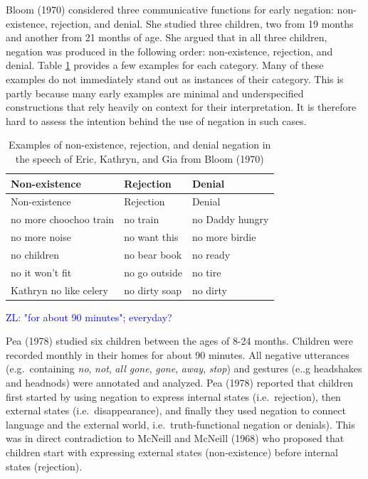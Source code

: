 \documentclass[
  english,
  man,floatsintext]{apa6}
\begin{document}
Bloom (1970) considered three communicative functions for early negation: non-existence, rejection, and denial. She studied three children, two from 19 months and another from 21 months of age. She argued that in all three children, negation was produced in the following order: non-existence, rejection, and denial. Table \ref{tab:bloom} provides a few examples for each category. Many of these examples do not immediately stand out as instances of their category. This is partly because many early examples are minimal and underspecified constructions that rely heavily on context for their interpretation. It is therefore hard to assess the intention behind the use of negation in such cases.

\begin{longtable}[]{@{}lll@{}}
\caption{\label{tab:bloom} Examples of non-existence, rejection, and denial negation in the speech of Eric, Kathryn, and Gia from Bloom (1970)}\tabularnewline
\toprule
Non-existence & Rejection & Denial \\
\midrule
\endfirsthead
\toprule
Non-existence & Rejection & Denial \\
\midrule
\endhead
no more choochoo train & no train & no Daddy hungry \\
no more noise & no want this & no more birdie \\
no children & no bear book & no ready \\
no it won't fit & no go outside & no tire \\
Kathryn no like celery & no dirty soap & no dirty \\
\bottomrule
\end{longtable}

\textcolor{blue}{ZL: "for about 90 minutes"; everyday?}

Pea (1978) studied six children between the ages of 8-24 months. Children were recorded monthly in their homes for about 90 minutes. All negative utterances (e.g.~containing \emph{no}, \emph{not}, \emph{all gone}, \emph{gone}, \emph{away}, \emph{stop}) and gestures (e..g headshakes and headnods) were annotated and analyzed. Pea (1978) reported that children first started by using negation to express internal states (i.e.~rejection), then external states (i.e.~disappearance), and finally they used negation to connect language and the external world, i.e.~truth-functional negation or denials). This was in direct contradiction to McNeill and McNeill (1968) who proposed that children start with expressing external states (non-existence) before internal states (rejection).
\end{document}
